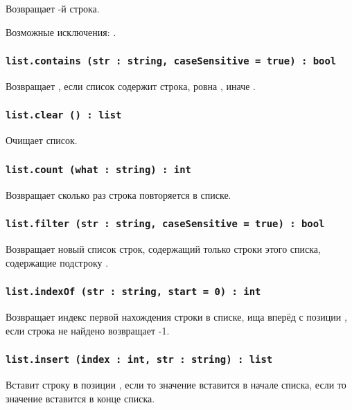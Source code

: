 Возвращает -й строка.

Возможные исключения: .

\subsubsection{\lstinline|list.contains (str : string, caseSensitive = true) : bool|}

Возвращает \true, если список содержит строка, ровна , иначе \false.

\subsubsection{\lstinline|list.clear () : list|}

Очищает список.

\subsubsection{\lstinline|list.count (what : string) : int|}

Возвращает сколько раз строка  повторяется в списке.

\subsubsection{\lstinline|list.filter (str : string, caseSensitive = true) : bool|}

Возвращает новый список строк, содержащий только строки этого списка, содержащие подстроку . 

\subsubsection{\lstinline|list.indexOf (str : string, start = 0) : int|}

Возвращает индекс первой нахождения строки  в списке, ища вперёд с позиции , если строка не найдено возвращает -1.

\subsubsection{\lstinline|list.insert (index : int, str : string) : list|}

Вставит строку  в позиции , если  то значение вставится в начале списка, если  то значение вставится в конце списка.

